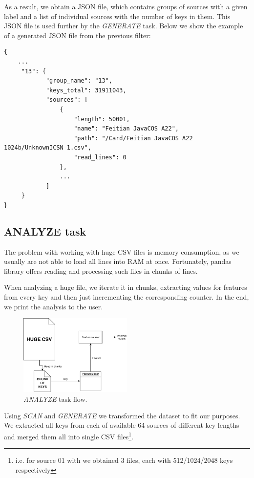 \noindent
As a result, we obtain a JSON file, which contains groups of sources with a given label and a list of individual sources with the number of keys in them. This JSON file is used further by the \textit{GENERATE} task. Below we show the example of a generated JSON file from the previous filter:

\begin{verbatim}
{
    ...
     "13": {
            "group_name": "13",
            "keys_total": 31911043,
            "sources": [
                {
                    "length": 50001,
                    "name": "Feitian JavaCOS A22",
                    "path": "/Card/Feitian JavaCOS A22 1024b/UnknownICSN 1.csv",
                    "read_lines": 0
                },
                ...
            ]
     }
}

\end{verbatim}

\subsection{ANALYZE task}

The problem with working with huge CSV files is memory consumption, as we usually are not able to load all lines into RAM at once. Fortunately, pandas library offers reading and processing such files in chunks of lines. 

When analyzing a huge file, we iterate it in chunks, extracting values for features from every key and then just incrementing the corresponding counter. In the end, we print the analysis to the user.

\begin{figure}[h]

\centering
\includegraphics[width=0.5\textwidth]{tex/images/analyze_task}
\caption{\textit{ANALYZE} task flow.}

\end{figure}

Using \textit{SCAN} and \textit{GENERATE} we transformed the dataset to fit our purposes. We extracted all keys from each of available 64 sources of different key lengths and merged them all into single CSV files\footnote{i.e. for source 01 with we obtained 3 files, each with 512/1024/2048 keys respectively}. 

